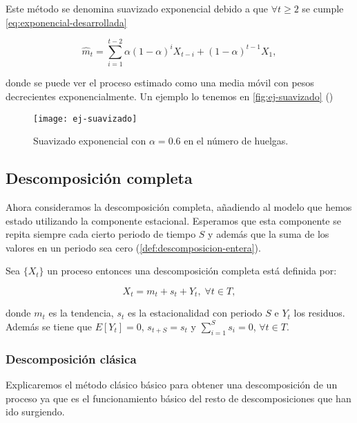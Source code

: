 Este método se denomina suavizado exponencial debido a que $\forall t \geq 2$ se cumple \eqref{eq:exponencial-desarrollada}

\begin{equation}
  \hat{m}_t = \sum \limits^{t - 2}_{i = 1} \alpha(1 - \alpha)^i X_{t - i} + (1 - \alpha)^{t - 1} X_1,
  \label{eq:exponencial-desarrollada}
\end{equation}

donde se puede ver el proceso estimado como una media móvil con pesos decrecientes exponencialmente. Un ejemplo lo tenemos en \autoref{fig:ej-suavizado} (\cite{brockwell2002introduction})

\begin{figure}[htpb]
  \centering
  \texttt{[image: ej-suavizado]}
  \caption{Suavizado exponencial con $\alpha = 0.6$ en el número de huelgas.}
  \label{fig:ej-suavizado}
\end{figure}

\subsection{Descomposición completa}

Ahora consideramos la descomposición completa, añadiendo al modelo que hemos estado utilizando la componente estacional. Esperamos que esta componente se repita siempre cada cierto periodo de tiempo $S$ y además que la suma de los valores en un periodo sea cero (\autoref{def:descomposicion-entera}).

\begin{definicion}
  Sea $\{X_t\}$ un proceso entonces una descomposición completa está definida por:

  $$ X_t = m_t + s_t + Y_t, \; \forall t \in T,$$

  donde $m_t$ es la tendencia, $s_t$ es la estacionalidad con periodo $S$ e $Y_t$ los residuos.  Además se tiene que $E[Y_t] = 0$, $s_{t + S} = s_{t}$ y $\sum \limits^{S}_{i = 1} s_i = 0$, $\forall t \in T$.
  \label{def:descomposicion-entera}
\end{definicion}

\subsubsection{Descomposición clásica}

Explicaremos el método clásico básico para obtener una descomposición de un proceso ya que es el funcionamiento básico del resto de descomposiciones que han ido surgiendo.

